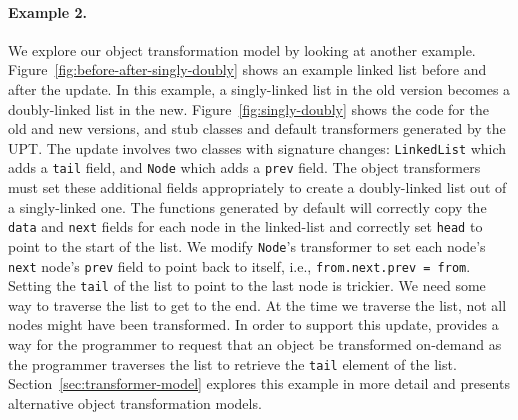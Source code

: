 


\paragraph{Example 2.}
We explore our object transformation model
by looking at another example.
Figure~\ref{fig:before-after-singly-doubly} shows an example linked list
before and after the update. In this example, a singly-linked list in the
old version becomes a doubly-linked list in the new.
Figure~\ref{fig:singly-doubly} shows the code for the old and new versions,
and stub classes and default transformers generated by the \acf{UPT}.
The update involves two classes with
signature changes: {\tt LinkedList} which adds a {\tt tail} field, and
{\tt Node} which adds a {\tt prev} field. The object transformers must
set these additional fields appropriately to create a doubly-linked list
out of a singly-linked one. The \JO functions generated by default will
correctly copy the {\tt data} and {\tt next} fields for each node in the
linked-list and correctly set {\tt head} to point to the start of the list.
We modify {\tt Node}'s transformer to set each node's {\tt next} node's
{\tt prev} field to point back to itself, i.e., {\tt from.next.prev =
from}.
Setting the {\tt tail} of the list to point to the last node is trickier.
We need some way to traverse the list to get to the end. At the time we
traverse the list, not all nodes might have been transformed. In order to
support this update, \JV provides a way for the programmer to request that
an object be transformed on-demand as the programmer traverses the list to
retrieve the {\tt tail} element of the list.  Section~\ref{sec:transformer-model}
explores this example in more detail and presents alternative object
transformation models.
